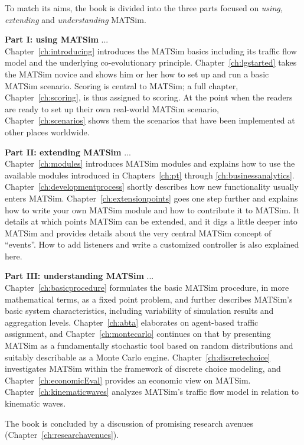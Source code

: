 To match its aims, the book is divided into the three parts focused on \emph{using, extending} and \emph{understanding} MATSim.

\textbf{Part I: using MATSim} ... \\
Chapter~\ref{ch:introducing} introduces the MATSim basics including its traffic flow model and the underlying co-evolutionary principle. Chapter~\ref{ch:lgstarted} takes the MATSim novice and shows him or her how to set up and run a basic MATSim scenario. Scoring is central to MATSim; a full chapter, Chapter~\ref{ch:scoring}, is thus assigned to scoring. At the point when the readers are ready to set up their own real-world MATSim scenario, Chapter~\ref{ch:scenarios} shows them the scenarios that have been implemented at other places worldwide. 

\textbf{Part II: extending MATSim} ... \\
Chapter~\ref{ch:modules} introduces MATSim modules and explains how to use the available modules introduced in Chapters~\ref{ch:pt} through \ref{ch:businessanalytics}. Chapter~\ref{ch:developmentprocess} shortly describes how new functionality usually enters MATSim. Chapter~\ref{ch:extensionpoints} goes one step further and explains how to write your own MATSim module and how to contribute it to MATSim. It details at which points MATSim can be extended, and it digs a little deeper into MATSim and provides details about the very central MATSim concept of ``events''. How to add listeners and write a customized controller is also explained here.

\textbf{Part III: understanding MATSim} ... \\
Chapter~\ref{ch:basicprocedure} formulates the basic MATSim procedure, in more mathematical terms, as a fixed point problem, and further describes MATSim's basic system characteristics, including variability of simulation results and aggregation levels. Chapter~\ref{ch:abta} elaborates on agent-based traffic assignment, and Chapter~\ref{ch:montecarlo} continues on that by presenting MATSim as a fundamentally stochastic tool based on random distributions and suitably describable as a Monte Carlo engine. Chapter~\ref{ch:discretechoice} investigates MATSim within the framework of discrete choice modeling, and Chapter~\ref{ch:economicEval} provides an economic view on MATSim. Chapter~\ref{ch:kinematicwaves} analyzes MATSim's traffic flow model in relation to kinematic waves.

The book is concluded by a discussion of promising research avenues (Chapter~\ref{ch:researchavenues}).

